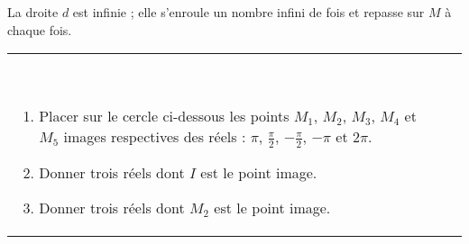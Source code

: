 \documentclass[10pt]{article}
\begin{document}
  La droite $d$ est infinie ; elle s'enroule un nombre infini de fois et repasse sur $M$ à chaque fois.

  \begin{tabular}{m{}m{}}
  \begin{exercice}~
      \begin{enumerate} 
        \item Placer sur le cercle ci-dessous les points $M_1$, $M_2$, $M_3$, $M_4$ et $M_5$ images respectives des réels : $\pi$, $\frac{\pi}{2}$, $-\frac{\pi}{2}$, $-\pi$ et $2\pi$. 
        \item Donner trois réels dont $I$ est le point image. \newline
          \dotfill
        \item Donner trois réels dont $M_2$ est le point image. \newline
          \dotfill
      \end{enumerate}


\end{exercice}
\end{tabular}
\end{document}
